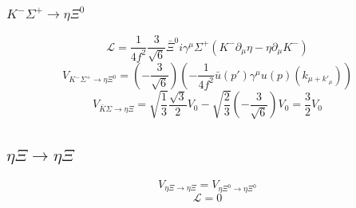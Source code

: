 \subsubsection{$K^{-}\Sigma^{+}\rightarrow\eta\Xi^{0}$}
\begin{equation}
	\mathcal{L}=\frac{1}{4f^2}\frac{3}{\sqrt{6}}\bar{\Xi}^{0}i\gamma^{\mu}\Sigma^{+}(K^{-}\partial_{\mu}\eta-\eta\partial_{\mu}K^{-})
\end{equation}
\begin{equation}
	V_{K^{-}\Sigma^{+}\rightarrow\eta\Xi^{0}}=\left(-\frac{3}{\sqrt{6}}\right)\left(-\frac{1}{4f^2}\bar{u}(p')\gamma^{\mu}u(p)(k_{\mu+k'_{\mu}})\right)
\end{equation}
\begin{equation}
	V_{\bar{K}\Sigma\rightarrow\eta\Xi}=\sqrt{\frac{1}{3}}\frac{\sqrt{3}}{2}V_{0}-\sqrt{\frac{2}{3}}(-\frac{3}{\sqrt{6}})V_{0}=\frac{3}{2}V_{0}
\end{equation}
\subsection{$\eta\Xi\rightarrow\eta\Xi$}
\begin{equation}
	V_{\eta\Xi\rightarrow\eta\Xi}=V_{\eta\Xi^{0}\rightarrow\eta\Xi^{0}}
\end{equation}
\begin{equation}
	\mathcal{L}=0
\end{equation}
